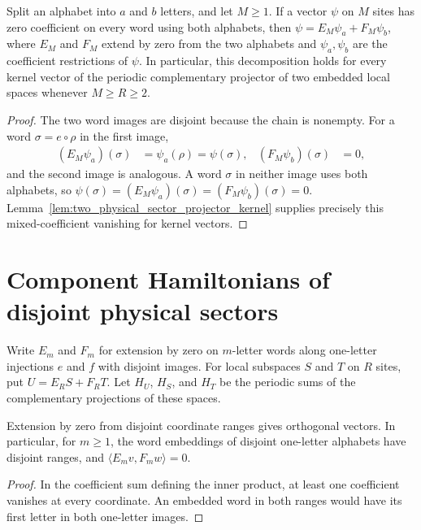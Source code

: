 \begin{lemma}
    \label{lem:physical_sector_state_decomposition}
    \leanok
    Split an alphabet into $a$ and $b$ letters, and let $M\ge1$.
    If a vector $\psi$ on $M$ sites has zero coefficient on every word
    using both alphabets, then $\psi=E_M\psi_a+F_M\psi_b$, where $E_M$
    and $F_M$ extend by zero from the two alphabets and $\psi_a,\psi_b$
    are the coefficient restrictions of $\psi$.
    In particular, this decomposition holds for every kernel vector of
    the periodic complementary projector of two embedded local spaces
    whenever $M\ge R\ge2$.
\end{lemma}
\begin{proof}
    \leanok
    The two word images are disjoint because the chain is nonempty.
    For a word $\sigma=e\circ\rho$ in the first image,
    \begin{align}
        (E_M\psi_a)(\sigma) & =\psi_a(\rho)=\psi(\sigma),
                            & (F_M\psi_b)(\sigma)         & =0,
    \end{align}
    and the second image is analogous. A word $\sigma$ in neither image
    uses both alphabets, so
    $\psi(\sigma)=(E_M\psi_a)(\sigma)=(F_M\psi_b)(\sigma)=0$.
    Lemma~\ref{lem:two_physical_sector_projector_kernel} supplies precisely
    this mixed-coefficient vanishing for kernel vectors.
\end{proof}

\section{Component Hamiltonians of disjoint physical sectors}

Write $E_m$ and $F_m$ for extension by zero on $m$-letter words along
one-letter injections $e$ and $f$ with disjoint images. For local subspaces
$S$ and $T$ on $R$ sites, put $U=E_R S+F_R T$. Let $H_U$, $H_S$, and $H_T$
be the periodic sums of the complementary projections of these spaces.

\begin{lemma}
    \label{lem:physical_sector_word_orthogonality}
    \leanok
    Extension by zero from disjoint coordinate ranges gives orthogonal
    vectors. In particular, for $m\ge1$, the word embeddings of
    disjoint one-letter alphabets have disjoint ranges, and
    $\langle E_m v,F_m w\rangle=0$.
\end{lemma}
\begin{proof}
    \leanok
    In the coefficient sum defining the inner product, at least one
    coefficient vanishes at every coordinate. An embedded word in both
    ranges would have its first letter in both one-letter images.
\end{proof}

